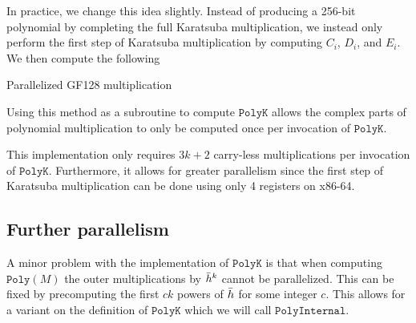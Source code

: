 \documentclass[hctr.tex]{subfiles}
\begin{document}
In practice, we change this idea slightly. Instead of producing a 256-bit polynomial by completing the full Karatsuba multiplication, we instead only perform the first step of Karatsuba multiplication by computing $C_i$, $D_i$, and $E_i$. We then compute the following
\begin{algorithm}[H]
	\caption{Parallelized GF128 multiplication}\label{parallelgf128}
\end{algorithm}
Using this method as a subroutine to compute $\texttt{PolyK}$ allows the complex parts of polynomial multiplication to only be computed once per invocation of $\texttt{PolyK}$.

This implementation only requires $3k + 2$ carry-less multiplications per invocation of $\texttt{PolyK}$. Furthermore, it allows for greater parallelism since the first step of Karatsuba multiplication can be done using only 4 registers on x86-64.

\subsection{Further parallelism}
A minor problem with the implementation of $\texttt{PolyK}$ is that when computing $\texttt{Poly}(M)$ the outer multiplications by $\bar{h}^{k}$ cannot be parallelized. This can be fixed by precomputing the first $ck$ powers of $\bar{h}$ for some integer $c$. This allows for a variant on the definition of $\texttt{PolyK}$ which we will call $\texttt{PolyInternal}$.
\end{document}
